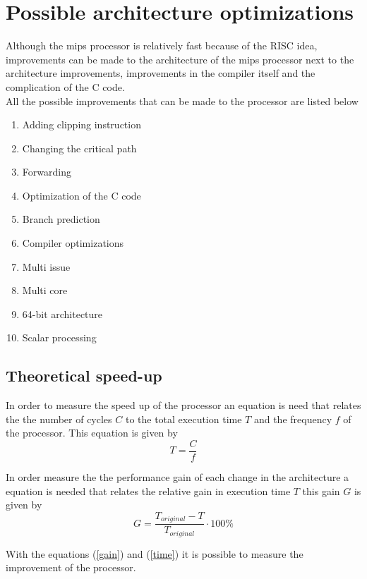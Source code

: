 \documentclass[10pt]{article}
\begin{document}
\section{Possible architecture  optimizations }

Although the mips processor is relatively fast because of the RISC idea, improvements can be made to the architecture of the mips processor next to  the architecture improvements, improvements in the compiler itself and the complication of the C code.\\
All the possible improvements that can be made to the processor are listed below 
\begin{enumerate} \label{improvs}
  \item Adding clipping instruction
  \item Changing the critical path
  \item Forwarding
  \item Optimization of the C code
  \item Branch prediction
  \item Compiler optimizations
  \item Multi issue
  \item Multi core
  \item 64-bit architecture
  \item Scalar processing
\end{enumerate}


\subsection{Theoretical speed-up}

In order to measure the speed up of the processor an equation is need that relates the the number of cycles $C$ to the total execution time $T$ and the frequency $f$ of the processor. 
This equation is given by 
\begin{equation}\label{time}
  T = \frac{C}{f}
\end{equation}

In order measure the the performance gain of each change in the architecture a equation is needed that relates the relative gain in execution time $T$ this gain $G$ is given by
\begin{equation}\label{gain}
  G = \frac{T_{original} - T}{T_{original}} \cdot 100 \%
\end{equation}

With the equations (\ref{gain}) and (\ref{time}) it is possible to measure the improvement of the processor. 
\end{document}
